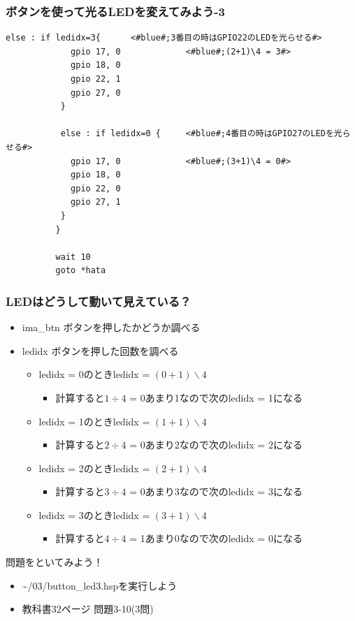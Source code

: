 \begin{frame}[fragile]
  \frametitle{ボタンを使って光るLEDを変えてみよう-3}
  \begin{lstlisting}[title=button\_led3.hsp 後半, label=button_led3.hsp-3]
           else : if ledidx=3{      <#blue#;3番目の時はGPIO22のLEDを光らせる#>
             gpio 17, 0             <#blue#;(2+1)\4 = 3#>
             gpio 18, 0
             gpio 22, 1
             gpio 27, 0
           }

           else : if ledidx=0 {     <#blue#;4番目の時はGPIO27のLEDを光らせる#>
             gpio 17, 0             <#blue#;(3+1)\4 = 0#>
             gpio 18, 0
             gpio 22, 0
             gpio 27, 1
           }
          }

          wait 10
          goto *hata
  \end{lstlisting}
\end{frame}

\begin{frame}
  \frametitle{LEDはどうして動いて見えている？}
  \begin{itemize}
    \item ima\_btn ボタンを押したかどうか調べる
    \item ledidx ボタンを押した回数を調べる
    \begin{itemize}
      \item ledidx = 0のときledidx = $(0+1)\backslash4$
      \begin{itemize}
        \item 計算すると$1\div4$ = 0あまり1なので次のledidx = 1になる
      \end{itemize}
      \item ledidx = 1のときledidx = $(1+1)\backslash4$ 
      \begin{itemize}
        \item 計算すると$2\div4$ = 0あまり2なので次のledidx = 2になる 
      \end{itemize}
      \item ledidx = 2のときledidx = $(2+1)\backslash4$ 
      \begin{itemize}
        \item 計算すると$3\div4$ = 0あまり3なので次のledidx = 3になる
      \end{itemize}
      \item ledidx = 3のときledidx = $(3+1)\backslash4$ 
      \begin{itemize}
        \item 計算すると$4\div4$ = 1あまり0なので次のledidx = 0になる
      \end{itemize}
    \end{itemize}
  \end{itemize}
\end{frame}

\begin{frame}
  \begin{exampleblock}{問題をといてみよう！}
    \begin{itemize}
      \item \sim/03/button\_led3.hspを実行しよう
      \item 教科書32ページ 問題3-10(3問)
    \end{itemize}
  \end{exampleblock} 
\end{frame}
